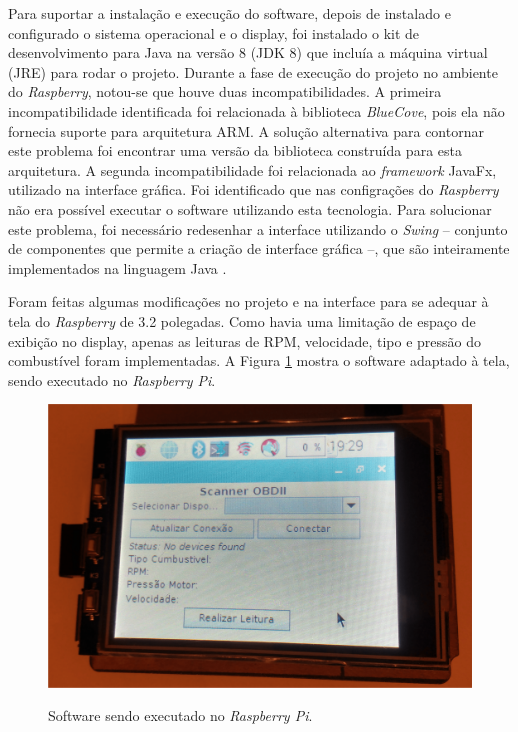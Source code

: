 Para suportar a instalação e execução do software, depois de instalado e configurado o sistema operacional e o display, foi instalado o kit de desenvolvimento para Java na versão 8 (JDK 8) que incluía a máquina virtual (JRE) para rodar o projeto. Durante a fase de execução do projeto no ambiente do \textit{Raspberry}, notou-se que houve duas incompatibilidades. A primeira incompatibilidade identificada foi relacionada à biblioteca \textit{BlueCove}, pois ela não fornecia suporte para arquitetura ARM. A solução alternativa para contornar este problema foi encontrar uma versão da biblioteca construída para esta arquitetura. A segunda incompatibilidade foi relacionada ao \textit{framework} JavaFx, utilizado na interface gráfica. Foi identificado que nas configrações do \textit{Raspberry} não era possível executar o software utilizando esta tecnologia. Para solucionar este problema, foi necessário redesenhar a interface utilizando o \textit{Swing} – conjunto de componentes que permite a criação de interface gráfica –, que são inteiramente implementados na linguagem Java \cite{oracle}.

Foram feitas algumas modificações no projeto e na interface para se adequar à tela do \textit{Raspberry} de 3.2 polegadas. Como havia uma limitação de espaço de exibição no display, apenas as leituras de RPM, velocidade, tipo e pressão do combustível foram implementadas. A Figura \ref{Fig:raspberry_sistema} mostra o software adaptado à tela, sendo executado no \textit{Raspberry Pi}.

\begin{figure}[!ht]
\centering
\caption{Software sendo executado no \textit{Raspberry Pi}.} 
{\includegraphics[scale=.15]{imagens/sistemaRodandoRaspberry-min.png}}\\
 \label{Fig:raspberry_sistema}
\end{figure}

